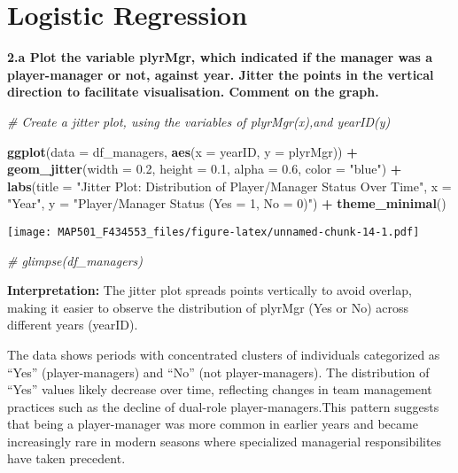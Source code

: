 \documentclass[
]{article}
\newenvironment{Shaded}{\begin{snugshade}}{\end{snugshade}}
\newcommand{\AttributeTok}[1]{\textcolor[rgb]{0.13,0.29,0.53}{#1}}
\newcommand{\CommentTok}[1]{\textcolor[rgb]{0.56,0.35,0.01}{\textit{#1}}}
\newcommand{\FloatTok}[1]{\textcolor[rgb]{0.00,0.00,0.81}{#1}}
\newcommand{\FunctionTok}[1]{\textcolor[rgb]{0.13,0.29,0.53}{\textbf{#1}}}
\newcommand{\NormalTok}[1]{#1}
\newcommand{\SpecialCharTok}[1]{\textcolor[rgb]{0.81,0.36,0.00}{\textbf{#1}}}
\newcommand{\StringTok}[1]{\textcolor[rgb]{0.31,0.60,0.02}{#1}}
\begin{document}
\section{Logistic Regression}\label{logistic-regression}

\textbf{2.a Plot the variable plyrMgr, which indicated if the manager
was a player-manager or not, against year. Jitter the points in the
vertical direction to facilitate visualisation. Comment on the graph.}

\begin{Shaded}
\begin{Highlighting}[]
\CommentTok{\# Create a jitter plot, using the variables of plyrMgr(x),and yearID(y)}

\FunctionTok{ggplot}\NormalTok{(}\AttributeTok{data =}\NormalTok{ df\_managers, }\FunctionTok{aes}\NormalTok{(}\AttributeTok{x =}\NormalTok{ yearID, }\AttributeTok{y =}\NormalTok{ plyrMgr)) }\SpecialCharTok{+}
  \FunctionTok{geom\_jitter}\NormalTok{(}\AttributeTok{width =} \FloatTok{0.2}\NormalTok{, }\AttributeTok{height =} \FloatTok{0.1}\NormalTok{, }\AttributeTok{alpha =} \FloatTok{0.6}\NormalTok{, }\AttributeTok{color =} \StringTok{"blue"}\NormalTok{) }\SpecialCharTok{+}
  \FunctionTok{labs}\NormalTok{(}\AttributeTok{title =} \StringTok{"Jitter Plot: Distribution of Player/Manager Status Over Time"}\NormalTok{,}
       \AttributeTok{x =} \StringTok{"Year"}\NormalTok{,}
       \AttributeTok{y =} \StringTok{"Player/Manager Status (Yes = 1, No = 0)"}\NormalTok{) }\SpecialCharTok{+}
  \FunctionTok{theme\_minimal}\NormalTok{()}
\end{Highlighting}
\end{Shaded}

\texttt{[image: MAP501\_F434553\_files/figure-latex/unnamed-chunk-14-1.pdf]}

\begin{Shaded}
\begin{Highlighting}[]
\CommentTok{\# glimpse(df\_managers)}
\end{Highlighting}
\end{Shaded}

\textbf{Interpretation:} The jitter plot spreads points vertically to
avoid overlap, making it easier to observe the distribution of plyrMgr
(Yes or No) across different years (yearID).

The data shows periods with concentrated clusters of individuals
categorized as ``Yes'' (player-managers) and ``No'' (not
player-managers). The distribution of ``Yes'' values likely decrease
over time, reflecting changes in team management practices such as the
decline of dual-role player-managers.This pattern suggests that being a
player-manager was more common in earlier years and became increasingly
rare in modern seasons where specialized managerial responsibilites have
taken precedent.
\end{document}
